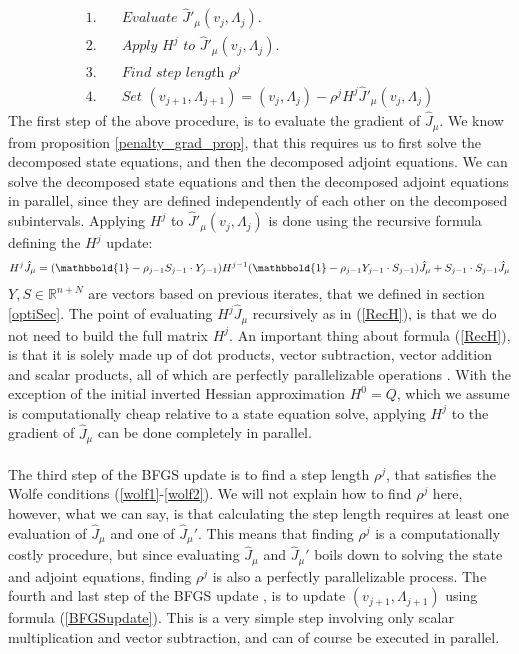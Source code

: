 \begin{align*}
1.\quad&\textit{Evaluate $\hat J'_{\mu}(v_j,\Lambda_j)$.} \\
2.\quad&\textit{Apply $H^j$ to $\hat J'_{\mu}(v_j,\Lambda_j)$.}\\
3.\quad&\textit{Find step length $\rho^j$} \\
4.\quad&\textit{Set $(v_{j+1},\Lambda_{j+1}) = (v_j,\Lambda_j) - \rho^j H^j \hat J'_{\mu}(v_j,\Lambda_j)$} 
\end{align*}
The first step of the above procedure, is to evaluate the gradient of $\hat J_{\mu}$. We know from proposition \ref{penalty_grad_prop}, that this requires us to first solve the decomposed state equations, and then the decomposed adjoint equations. We can solve the decomposed state equations and then the decomposed adjoint equations in parallel, since they are defined independently of each other on the decomposed subintervals. Applying $H^j$ to $\hat J'_{\mu}(v_j,\Lambda_j)$ is done using the recursive formula defining the $H^j$ update:
\begin{align}
H^j \hat J_{\mu} = (\mathbbold{1}-\rho_{j-1}S_{j-1}\cdot Y_{j-1})H^{j-1}(\mathbbold{1} -\rho_{j-1}Y_{j-1}\cdot S_{j-1})\hat J_{\mu} + S_{j-1}\cdot S_{j-1}\hat J_{\mu} \label{RecH}
\end{align}
$Y,S\in\mathbb{R}^{n+N}$ are vectors based on previous iterates, that we defined in section \ref{optiSec}. The point of evaluating $H^j \hat J_{\mu}$ recursively as in (\ref{RecH}), is that we do not need to build the full matrix $H^j$. An important thing about formula (\ref{RecH}), is that it is solely made up of dot products, vector subtraction, vector addition and scalar products, all of which are perfectly parallelizable operations \cite{grama2003introduction}. With the exception of the initial inverted Hessian approximation $H^0=Q$, which we assume is computationally cheap relative to a state equation solve, applying $H^j$ to the gradient of $\hat J_{\mu}$ can be done completely in parallel. 
\\
\\
The third step of the BFGS update is to find a step length $\rho^j$, that satisfies the Wolfe conditions (\ref{wolf1}-\ref{wolf2}). We will not explain how to find $\rho^j$ here, however, what we can say, is that calculating the step length requires at least one evaluation of $\hat J_{\mu}$ and one of $\hat J_{\mu}'$. This means that finding $\rho^j$ is a computationally costly procedure, but since evaluating $\hat J_{\mu}$ and $\hat J_{\mu}'$ boils down to solving the state and adjoint equations, finding $\rho^j$ is also a perfectly parallelizable process. The fourth and last step of the BFGS update , is to update $(v_{j+1},\Lambda_{j+1})$ using formula (\ref{BFGSupdate}). This is a very simple step involving only scalar multiplication and vector subtraction, and can of course be executed in parallel.
